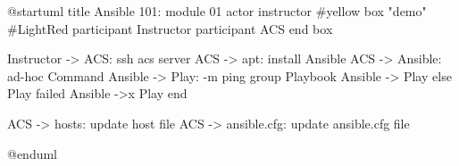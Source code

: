@startuml
title Ansible 101: module 01
actor instructor #yellow
box "demo" #LightRed
  participant Instructor
  participant ACS
end box


Instructor -> ACS: ssh acs server
ACS -> apt: install Ansible
ACS -> Ansible: ad-hoc Command
Ansible -> Play: -m ping
group Playbook
  Ansible -> Play
else Play failed
  Ansible ->x Play
end

ACS -> hosts: update host file
ACS -> ansible.cfg: update ansible.cfg file


@enduml
